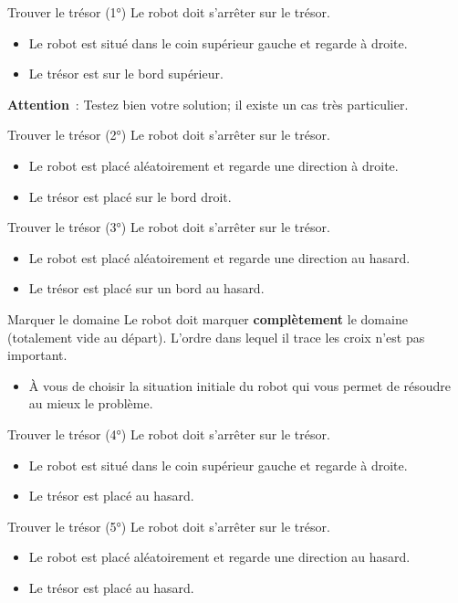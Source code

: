 		\begin{Exercice}{Trouver le trésor (1°)}
			Le robot doit s'arrêter sur le trésor.

			\begin{itemize}
			\item Le robot est situé dans le coin supérieur gauche et regarde à droite.
			\item Le trésor est sur le bord supérieur.
			\end{itemize}

			\textbf{Attention}~: 
			Testez bien votre solution; il existe un cas très particulier.
		\end{Exercice}

		\begin{Exercice}{Trouver le trésor (2°)}
			Le robot doit s'arrêter sur le trésor.

			\begin{itemize}
			\item Le robot est placé aléatoirement et regarde une direction à droite.
			\item Le trésor est placé sur le bord droit.
			\end{itemize}
		\end{Exercice}

		\begin{Exercice}{Trouver le trésor (3°)}
			Le robot doit s'arrêter sur le trésor.

			\begin{itemize}
			\item Le robot est placé aléatoirement et regarde une direction au hasard.
			\item Le trésor est placé sur un bord au hasard.
			\end{itemize}
		\end{Exercice}

		\begin{Exercice}{Marquer le domaine}
			Le robot doit marquer \textbf{complètement} le domaine
			(totalement vide au départ). 
			L'ordre dans lequel il trace les croix n'est pas important.

			\begin{itemize}
			\item
				À vous de choisir la situation initiale du robot qui vous permet de
				résoudre au mieux le problème.
			\end{itemize}
		\end{Exercice}

		\begin{Exercice}{Trouver le trésor (4°)}
			Le robot doit s'arrêter sur le trésor.

			\begin{itemize}
			\item Le robot est situé dans le coin supérieur gauche et regarde à droite.
			\item Le trésor est placé au hasard.
			\end{itemize}
		\end{Exercice}

		\begin{Exercice}{Trouver le trésor (5°)}
			Le robot doit s'arrêter sur le trésor.

			\begin{itemize}
			\item Le robot est placé aléatoirement et regarde une direction au hasard.
			\item Le trésor est placé au hasard.
			\end{itemize}
		\end{Exercice}
			
